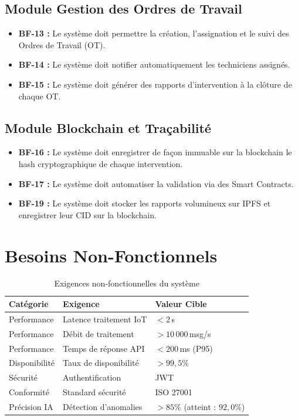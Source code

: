\documentclass[12pt, a4paper, oneside]{report}
\begin{document}
\subsection{Module Gestion des Ordres de Travail}
\begin{itemize}
  \item \textbf{BF-13 :} Le système doit permettre la création, l'assignation et le suivi des Ordres de Travail (OT).
  \item \textbf{BF-14 :} Le système doit notifier automatiquement les techniciens assignés.
  \item \textbf{BF-15 :} Le système doit générer des rapports d'intervention à la clôture de chaque OT.
\end{itemize}

\subsection{Module Blockchain et Traçabilité}
\begin{itemize}
  \item \textbf{BF-16 :} Le système doit enregistrer de façon immuable sur la blockchain le
  hash cryptographique de chaque intervention.
  \item \textbf{BF-17 :} Le système doit automatiser la validation via des Smart Contracts.
  \item \textbf{BF-19 :} Le système doit stocker les rapports volumineux sur IPFS et enregistrer
  leur CID sur la blockchain.
\end{itemize}

\section{Besoins Non-Fonctionnels}

\begin{table}[H]
  \centering
  \begin{tabularx}{\textwidth}{L{2.5cm} L{4.5cm} C{2.5cm}}
    \toprule
    \textbf{Catégorie} &
    \textbf{Exigence} &
    \textbf{Valeur Cible} \\
    \midrule
    Performance & Latence traitement IoT & $< 2$\,s \\
    Performance & Débit de traitement & $> 10\,000$\,msg/s \\
    Performance & Temps de réponse API & $< 200$\,ms (P95) \\
    Disponibilité & Taux de disponibilité & $> 99{,}5\%$ \\
    Sécurité & Authentification & JWT \\
    Conformité & Standard sécurité & ISO 27001 \\
    Précision IA & Détection d'anomalies & $> 85\%$ (atteint : $92{,}0\%$) \\
    \bottomrule
  \end{tabularx}
  \caption{Exigences non-fonctionnelles du système}
\end{table}
\end{document}
